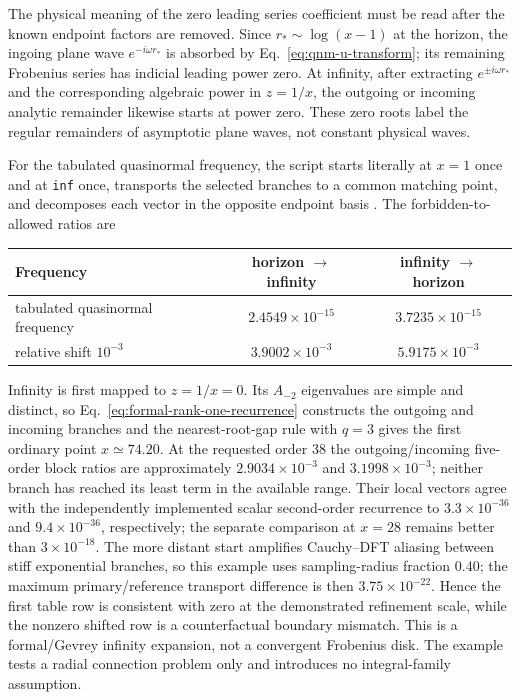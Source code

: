 \documentclass[11pt]{article}
\renewcommand{\_}{\origunderscore\allowbreak}
\begin{document}
The physical meaning of the zero leading series coefficient must be read after the known
endpoint factors are removed.  Since $r_*\sim\log(x-1)$ at the horizon, the ingoing plane
wave $e^{-i\omega r_*}$ is absorbed by Eq.~\eqref{eq:qnm-u-transform}; its remaining
Frobenius series has indicial leading power zero.  At infinity, after extracting
$e^{\pm i\omega r_*}$ and the corresponding algebraic power in $z=1/x$, the outgoing or
incoming analytic remainder likewise starts at power zero.  These zero roots label the
regular remainders of asymptotic plane waves, not constant physical waves.

For the tabulated quasinormal frequency, the script starts literally at $x=1$ once and at
\texttt{inf} once, transports the selected branches to a common matching point, and
decomposes each vector in the opposite endpoint basis
\cite{Leaver:1985ax,Berti:2009kk}.  The forbidden-to-allowed ratios are
\begin{center}
\begin{tabular}{lcc}
\toprule
Frequency & horizon $\to$ infinity & infinity $\to$ horizon\\
\midrule
tabulated quasinormal frequency & $2.4549\times10^{-15}$ & $3.7235\times10^{-15}$\\
relative shift $10^{-3}$ & $3.9002\times10^{-3}$ & $5.9175\times10^{-3}$\\
\bottomrule
\end{tabular}
\end{center}
Infinity is first mapped to $z=1/x=0$.  Its $A_{-2}$ eigenvalues are simple and distinct, so
Eq.~\eqref{eq:formal-rank-one-recurrence} constructs the outgoing and incoming branches and
the nearest-root-gap rule with $q=3$ gives the first ordinary point $x\simeq74.20$.  At the
requested order 38 the outgoing/incoming five-order block ratios are approximately
$2.9034\times10^{-3}$ and $3.1998\times10^{-3}$; neither branch has reached its least term
in the available range. Their local vectors agree with the independently implemented scalar
second-order recurrence to $3.3\times10^{-36}$ and $9.4\times10^{-36}$, respectively; the
separate comparison at $x=28$ remains better than $3\times10^{-18}$.  The more distant
start amplifies Cauchy--DFT aliasing between stiff exponential branches, so this example
uses sampling-radius fraction $0.40$; the maximum primary/reference transport difference is
then $3.75\times10^{-22}$.
Hence the first table row is consistent with zero at the demonstrated
refinement scale, while the nonzero shifted row is a counterfactual boundary mismatch.  This
is a formal/Gevrey infinity expansion, not a convergent Frobenius disk.  The example tests a
radial connection problem only and introduces no integral-family assumption.
\end{document}
